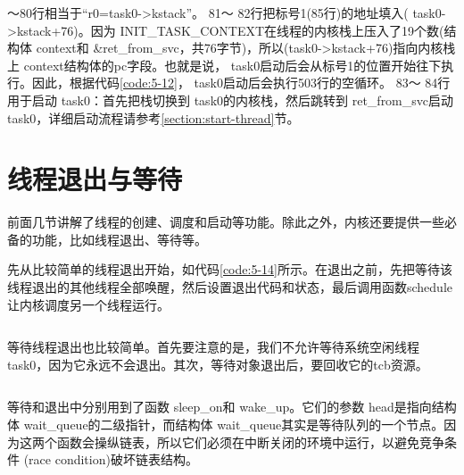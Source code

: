 \documentclass[main.tex]{subfiles}
\begin{document}
\begin{CJK*}{UTF8}{song}
～80行相当于“r0=task0-\textgreater kstack”。 81～ 82行把标号1(85行)的地址填入( task0-\textgreater kstack+76)。因为 INIT\_\-TASK\_\-CONTEXT在线程的内核栈上压入了19个数(结构体 context和 \&ret\_\-from\_\-svc，共76字节)，所以(task0-\textgreater kstack+76)指向内核栈上 context结构体的pc字段。也就是说， task0启动后会从标号1的位置开始往下执行。因此，根据代码\ref{code:5-12}， task0启动后会执行503行的空循环。 83～ 84行用于启动 task0：首先把栈切换到 task0的内核栈，然后跳转到 ret\_\-from\_\-svc启动 task0，详细启动流程请参考\ref{section:start-thread}节。

\section{线程退出与等待}
前面几节讲解了线程的创建、调度和启动等功能。除此之外，内核还要提供一些必备的功能，比如线程退出、等待等。

\par
先从比较简单的线程退出开始，如代码\ref{code:5-14}所示。在退出之前，先把等待该线程退出的其他线程全部唤醒，然后设置退出代码和状态，最后调用函数schedule让内核调度另一个线程运行。

\begin{code}
\label{code:5-14}
\inputminted[firstline=205,lastline=222,linenos,numbersep=5pt,frame=lines,framesep=2mm]{c}{src/chapter05/kernel/task.c}
\end{code}

等待线程退出也比较简单。首先要注意的是，我们不允许等待系统空闲线程task0，因为它永远不会退出。其次，等待对象退出后，要回收它的tcb资源。

\begin{code}
\label{code:5-15}
\inputminted[firstline=224,lastline=265,linenos,numbersep=5pt,frame=lines,framesep=2mm]{c}{src/chapter05/kernel/task.c}
\end{code}

等待和退出中分别用到了函数 sleep\_\-on和 wake\_\-up。它们的参数 head是指向结构体 wait\_\-queue的二级指针，而结构体 wait\_\-queue其实是等待队列的一个节点。因为这两个函数会操纵链表，所以它们必须在中断关闭的环境中运行，以避免竞争条件 (race condition)破坏链表结构。

\begin{code}
\label{code:5-16}
\inputminted[firstline=120,lastline=123,linenos,numbersep=5pt,frame=lines,framesep=2mm]{c}{src/chapter05/kernel/kernel.h}
\end{code}


\end{CJK*}
\end{document}
